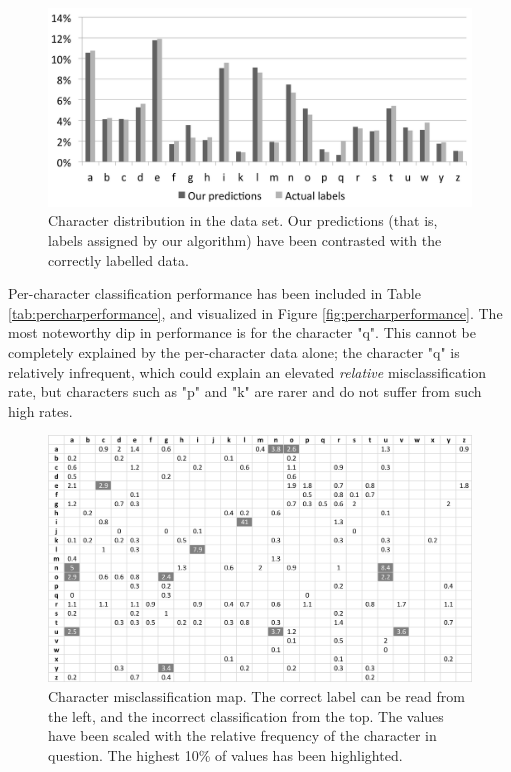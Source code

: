 \documentclass{netsec2012}
\begin{document}
\begin{figure}[t]
\centering
\includegraphics[width=120mm]{chardist.png}
\caption{Character distribution in the data set.  Our predictions (that is, labels assigned by our
algorithm) have been contrasted with the correctly labelled data.}
\label{fig:chardistribution}
\end{figure}

Per-character classification performance has been included in Table \ref{tab:percharperformance},
and visualized in Figure \ref{fig:percharperformance}.  The most noteworthy dip in performance is
for the character "q".  This cannot be completely explained by the per-character data alone; the
character "q" is relatively infrequent, which could explain an elevated \emph{relative}
misclassification rate, but characters such as "p" and "k" are rarer and do not suffer from such
high rates.

\begin{figure}[t]
\centering
\includegraphics[width=135mm]{charmap.png}
\caption{Character misclassification map.  The correct label can be read from the left, and the
incorrect classification from the top.  The values have been scaled with the relative frequency of
the character in question.  The highest 10\% of values has been highlighted.}
\label{fig:charmisclassifications}
\end{figure}
\end{document}
